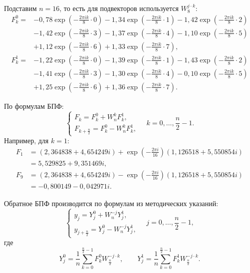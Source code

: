 \documentclass[14pt,a4paper]{extarticle}
\begin{document}
Подставим $n=16$, то есть для подвекторов используется $W_8^{j\cdot k}$:
\begingroup\scriptsize
\begin{align*}
F^0_k={}&-0{,}78\exp\left(-\frac{2\pi i k}{8}\cdot0\right)
-1{,}34\exp\left(-\frac{2\pi i k}{8}\cdot1\right)
-1{,}42\exp\left(-\frac{2\pi i k}{8}\cdot2\right)\\
&-1{,}42\exp\left(-\frac{2\pi i k}{8}\cdot3\right)
-1{,}37\exp\left(-\frac{2\pi i k}{8}\cdot4\right)
-1{,}10\exp\left(-\frac{2\pi i k}{8}\cdot5\right)\\
&+1{,}12\exp\left(-\frac{2\pi i k}{8}\cdot6\right)
+1{,}33\exp\left(-\frac{2\pi i k}{8}\cdot7\right),\\
F^1_k={}&-1{,}22\exp\left(-\frac{2\pi i k}{8}\cdot0\right)
-1{,}39\exp\left(-\frac{2\pi i k}{8}\cdot1\right)
-1{,}43\exp\left(-\frac{2\pi i k}{8}\cdot2\right)\\
&-1{,}41\exp\left(-\frac{2\pi i k}{8}\cdot3\right)
-1{,}30\exp\left(-\frac{2\pi i k}{8}\cdot4\right)
-0{,}10\exp\left(-\frac{2\pi i k}{8}\cdot5\right)\\
&+1{,}25\exp\left(-\frac{2\pi i k}{8}\cdot6\right)
+1{,}36\exp\left(-\frac{2\pi i k}{8}\cdot7\right).
\end{align*}
\endgroup

По формулам БПФ:
\[
\begin{cases}
F_k=F^0_k+W_n^kF^1_k,\\
F_{k+\frac{n}{2}}=F^0_k-W_n^kF^1_k,
\end{cases}
\quad k=0,\ldots,\frac{n}{2}-1.
\]
Например, для $k=1$:
\begingroup\small
\begin{align*}
F_1&=(2{,}364838+4{,}654249i)
+\exp\left(-\frac{2\pi i}{16}\right)(1{,}126518+5{,}550854i)\\
&=5{,}529825+9{,}351469i,\\
F_9&=(2{,}364838+4{,}654249i)
-\exp\left(-\frac{2\pi i}{16}\right)(1{,}126518+5{,}550854i)\\
&=-0{,}800149-0{,}042971i.
\end{align*}
\endgroup

Обратное БПФ производится по формулам из методических указаний:
\[
\begin{cases}
y_j=Y^0_j+W_n^{-j}Y^1_j,\\
y_{j+\frac{n}{2}}=Y^0_j-W_n^{-j}Y^1_j,
\end{cases}
\quad j=0,\ldots,\frac{n}{2}-1,
\]
где
\[
Y^0_j=\frac{1}{n}\sum_{k=0}^{\frac{n}{2}-1}F^0_k W_{\frac{n}{2}}^{-j\cdot k},
\qquad
Y^1_j=\frac{1}{n}\sum_{k=0}^{\frac{n}{2}-1}F^1_k W_{\frac{n}{2}}^{-j\cdot k}.
\]
\end{document}
